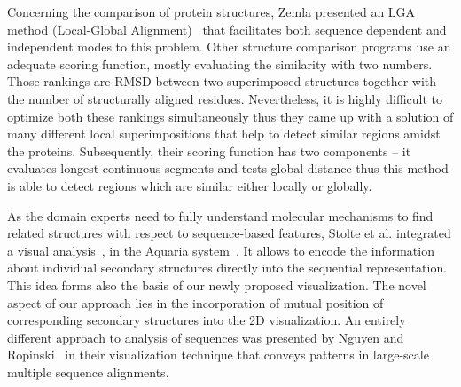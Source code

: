 \documentclass[twocolumn]{bmcart}%
\begin{document}
Concerning the comparison of protein structures, Zemla presented an LGA method (Local-Global Alignment)~\cite{Zemla2003} that facilitates both sequence dependent and independent modes to this problem.
Other structure comparison programs use an adequate scoring function, mostly evaluating the similarity with two numbers.
Those rankings are RMSD between two superimposed structures together with the number of structurally aligned residues.
Nevertheless, it is highly difficult to optimize both these rankings simultaneously thus they came up with a solution of many different local superimpositions that help to detect similar regions amidst the proteins.
Subsequently, their scoring function has two components -- it evaluates longest continuous segments and tests global distance thus this method is able to detect regions which are similar either locally or globally.

As the domain experts need to fully understand molecular mechanisms to find related structures with respect to sequence-based features, Stolte et al. integrated a visual analysis~\cite{Stolte2015}, in the Aquaria system~\cite{odonoghue2015}.
It allows to encode the information about individual secondary structures directly into the sequential representation.
This idea forms also the basis of our newly proposed visualization.
The novel aspect of our approach lies in the incorporation of mutual position of corresponding secondary structures into the 2D visualization.
An entirely different approach to analysis of sequences was presented by Nguyen and Ropinski~\cite{Nguyen2013} in their visualization technique that conveys patterns in large-scale multiple sequence alignments.
\end{document}
